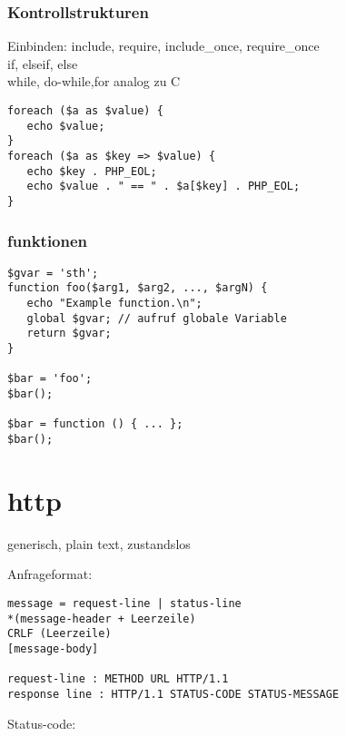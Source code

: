 \subsubsection{Kontrollstrukturen}
Einbinden: include, require, include\_once, require\_once\\
if, elseif, else\\
while, do-while,for analog zu C
\begin{verbatim}
foreach ($a as $value) {
   echo $value;
}
foreach ($a as $key => $value) {
   echo $key . PHP_EOL;
   echo $value . " == " . $a[$key] . PHP_EOL;
}
\end{verbatim}
\subsubsection{funktionen}
\begin{verbatim}
$gvar = 'sth';
function foo($arg1, $arg2, ..., $argN) {
   echo "Example function.\n";
   global $gvar; // aufruf globale Variable
   return $gvar;
}

$bar = 'foo';
$bar();

$bar = function () { ... };
$bar();
\end{verbatim}







\section{http}
generisch, plain text, zustandslos

Anfrageformat:
\begin{verbatim}
message = request-line | status-line
*(message-header + Leerzeile)
CRLF (Leerzeile)
[message-body]

request-line : METHOD URL HTTP/1.1
response line : HTTP/1.1 STATUS-CODE STATUS-MESSAGE
\end{verbatim}
Status-code:

